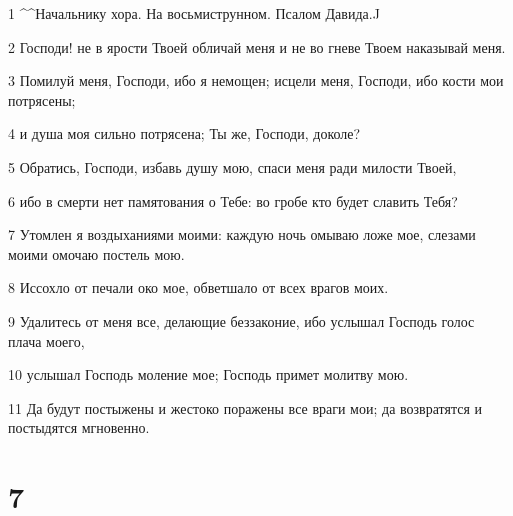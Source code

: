 \par 1 ^^Начальнику хора. На восьмиструнном. Псалом Давида.^^
\par 2 Господи! не в ярости Твоей обличай меня и не во гневе Твоем наказывай меня.
\par 3 Помилуй меня, Господи, ибо я немощен; исцели меня, Господи, ибо кости мои потрясены;
\par 4 и душа моя сильно потрясена; Ты же, Господи, доколе?
\par 5 Обратись, Господи, избавь душу мою, спаси меня ради милости Твоей,
\par 6 ибо в смерти нет памятования о Тебе: во гробе кто будет славить Тебя?
\par 7 Утомлен я воздыханиями моими: каждую ночь омываю ложе мое, слезами моими омочаю постель мою.
\par 8 Иссохло от печали око мое, обветшало от всех врагов моих.
\par 9 Удалитесь от меня все, делающие беззаконие, ибо услышал Господь голос плача моего,
\par 10 услышал Господь моление мое; Господь примет молитву мою.
\par 11 Да будут постыжены и жестоко поражены все враги мои; да возвратятся и постыдятся мгновенно.

\chapter{7}

